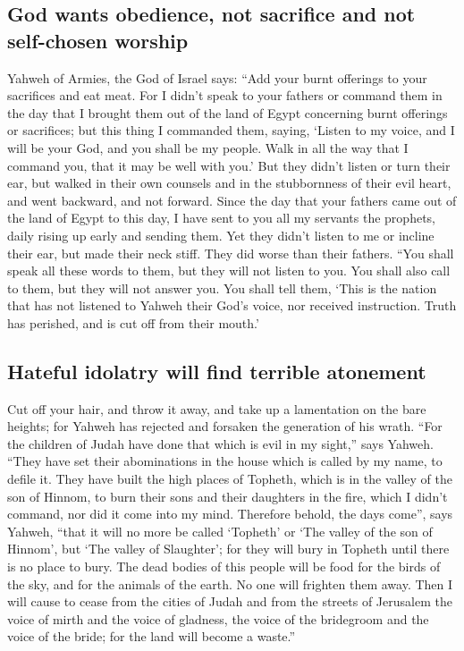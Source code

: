 \hypertarget{god-wants-obedience-not-sacrifice-and-not-self-chosen-worship}{%
\subsection{God wants obedience, not sacrifice and not self-chosen
worship}\label{god-wants-obedience-not-sacrifice-and-not-self-chosen-worship}}

 Yahweh of Armies, the God of Israel says: ``Add your
burnt offerings to your sacrifices and eat meat.  For I
didn't speak to your fathers or command them in the day that I brought
them out of the land of Egypt concerning burnt offerings or sacrifices;
 but this thing I commanded them, saying, `Listen to my
voice, and I will be your God, and you shall be my people. Walk in all
the way that I command you, that it may be well with you.'
 But they didn't listen or turn their ear, but walked in
their own counsels and in the stubbornness of their evil heart, and went
backward, and not forward.  Since the day that your
fathers came out of the land of Egypt to this day, I have sent to you
all my servants the prophets, daily rising up early and sending them.
 Yet they didn't listen to me or incline their ear, but
made their neck stiff. They did worse than their fathers.
 ``You shall speak all these words to them, but they will
not listen to you. You shall also call to them, but they will not answer
you.  You shall tell them, `This is the nation that has
not listened to Yahweh their God's voice, nor received instruction.
Truth has perished, and is cut off from their mouth.'

\hypertarget{hateful-idolatry-will-find-terrible-atonement}{%
\subsection{Hateful idolatry will find terrible
atonement}\label{hateful-idolatry-will-find-terrible-atonement}}

 Cut off your hair, and throw it away, and take up a
lamentation on the bare heights; for Yahweh has rejected and forsaken
the generation of his wrath.  ``For the children of Judah
have done that which is evil in my sight,'' says Yahweh. ``They have set
their abominations in the house which is called by my name, to defile
it.  They have built the high places of Topheth, which is
in the valley of the son of Hinnom, to burn their sons and their
daughters in the fire, which I didn't command, nor did it come into my
mind.  Therefore behold, the days come'', says Yahweh,
``that it will no more be called `Topheth' or `The valley of the son of
Hinnom', but `The valley of Slaughter'; for they will bury in Topheth
until there is no place to bury.  The dead bodies of this
people will be food for the birds of the sky, and for the animals of the
earth. No one will frighten them away.  Then I will cause
to cease from the cities of Judah and from the streets of Jerusalem the
voice of mirth and the voice of gladness, the voice of the bridegroom
and the voice of the bride; for the land will become a waste.''

